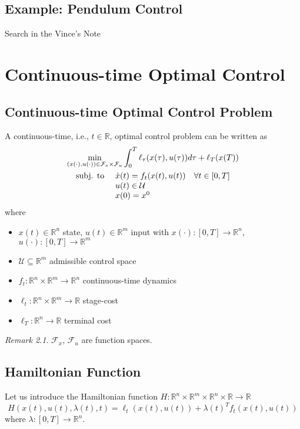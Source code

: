 \documentclass[openany]{book}
\theoremstyle{definition}
\theoremstyle{remark}
\newtheorem*{remark}{Remark}
\begin{document}
\section{Example: Pendulum Control}
Search in the Vince's Note



\chapter{Continuous-time Optimal Control}

\section{Continuous-time Optimal Control Problem}
A continuous-time, i.e., $t \in \mathbb{R}$, optimal control problem can be written as
\begin{gather*}
    \min_{(x(\cdot),u(\cdot))\in \mathcal{F}_x \times \mathcal{F}_u} \int_{0}^{T}\ell_\tau(x(\tau),u(\tau))d\tau+\ell_T(x(T))\\
    \begin{array}{l l }
        \text{subj. to } & \dot{x}(t) = f_t(x(t),u(t)) \quad \forall t \in [0,T]\\
                         & u(t) \in \mathcal{U}\\
                         & x(0) = x^0
    \end{array}
\end{gather*}
where
\begin{itemize}
    \item $x(t) \in \mathbb{R}^n$ state, $u(t) \in \mathbb{R}^m$ input with $x(\cdot):[0,T]\to\mathbb{R}^n$, $u(\cdot):[0,T]\to\mathbb{R}^m$
    \item $\mathcal{U} \subseteq \mathbb{R}^m$ admissible control space
    \item $f_t: \mathbb{R}^n \times \mathbb{R}^m \to \mathbb{R}^n$ continuous-time dynamics
    \item $\ell_t: \mathbb{R}^n \times \mathbb{R}^m \to \mathbb{R}$ stage-cost
    \item $\ell_T: \mathbb{R}^n \to \mathbb{R}$ terminal cost
\end{itemize}

\begin{remark}
$\mathcal{F}_x$, $\mathcal{F}_u$ are function spaces.
\end{remark}

\section{Hamiltonian Function}
Let us introduce the Hamiltonian function $H: \mathbb{R}^n \times \mathbb{R}^m \times \mathbb{R}^n \times \mathbb{R} \to \mathbb{R}$
\[
    H(x(t),u(t),\lambda(t),t) = \ell_t(x(t),u(t)) + \lambda(t)^T f_t(x(t),u(t))
\]
where $\lambda:[0,T] \to \mathbb{R}^n$.
\end{document}

